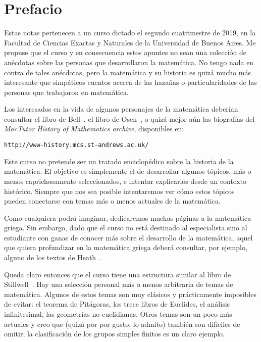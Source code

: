 \chapter*{Prefacio}

Estas notas pertenecen a un curso dictado el segundo cuatrimestre de 2019, en
la Facultad de Ciencias Exactas y Naturales de la Universidad de Buenos Aires.
Me propuse que el curso y en consecuencia estos apuntes no sean una colección
de anécdotas sobre las personas que desarrollaron la matemática. No tengo nada
en contra de tales anécdotas, pero la matemática y su historia es quizá mucho
más interesante que simpáticos cuentos acerca de las hazañas o particularidades
de las personas que trabajaron en matemática.

Los interesados en la vida de algunos personajes de la matemática deberían
consultar el libro de Bell~\cite{MR3728304}, el libro de Osen~\cite{MR0497806},
o quizá mejor aún las biografías del  \emph{MacTutor History of Mathematics
archive}, disponibles en:

\begin{center}
\verb+http://www-history.mcs.st-andrews.ac.uk/+
\end{center}

Este curso no pretende ser un tratado enciclopédico sobre la historia de la
matemática. El objetivo es simplemente el de desarrollar algunos tópicos, más o
menos caprichosamente seleccionados, e intentar explicarlos desde un contexto
histórico. Siempre que nos sea posible intentaremos ver cómo estos tópicos
pueden conectarse con temas más o menos actuales de la matemática. 

Como cualquiera podrá imaginar, dedicaremos muchas páginas a la matemática
griega. Sin embargo, dado que el curso no está destinado al especialista sino 
al estudiante con ganas de conocer más sobre el desarrollo de la matemática, 
aquel que quiera profundizar en la matemática griega 
deberá consultar, por ejemplo, alguno de los textos de Heath~\cite{MR654679,
MR654680,MR0156760}. 

Queda claro entonces que el curso tiene una estructura similar al libro de
Stillwell~\cite{MR2667826}.  Hay una selección personal más o menos arbitraria
de temas de matemática.  Algunos de estos temas son muy clásicos y
prácticamente imposibles de evitar: el teorema de Pitágoras, los trece libros
de Euclides, el análisis infinitesimal, las geometrías no euclidianas. Otros
temas son un poco más actuales y creo que (quizá por por gusto, lo admito)
también son difíciles de omitir; la clasificación de los grupos simples finitos
es un claro ejemplo.

